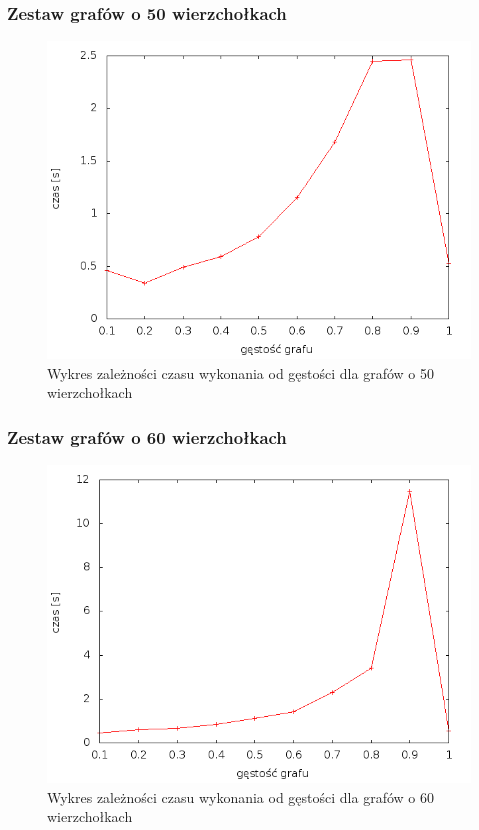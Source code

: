 \documentclass[12pt, a4paper]{article}
\begin{document}
\subsubsection*{Zestaw grafów o 50 wierzchołkach}
\begin{figure}[!h]
    \begin{center}
	\includegraphics[scale=0.5]{../experiment_1/img/dim/dim_50.png}
	\caption{Wykres zależności czasu wykonania od gęstości dla grafów o 50 wierzchołkach}
    \end{center}
\end{figure}
\FloatBarrier
\subsubsection*{Zestaw grafów o 60 wierzchołkach}
\begin{figure}[!h]
    \begin{center}
	\includegraphics[scale=0.5]{../experiment_1/img/dim/dim_60.png}
	\caption{Wykres zależności czasu wykonania od gęstości dla grafów o 60 wierzchołkach}
    \end{center}
\end{figure}
\FloatBarrier
\newpage
\end{document}
